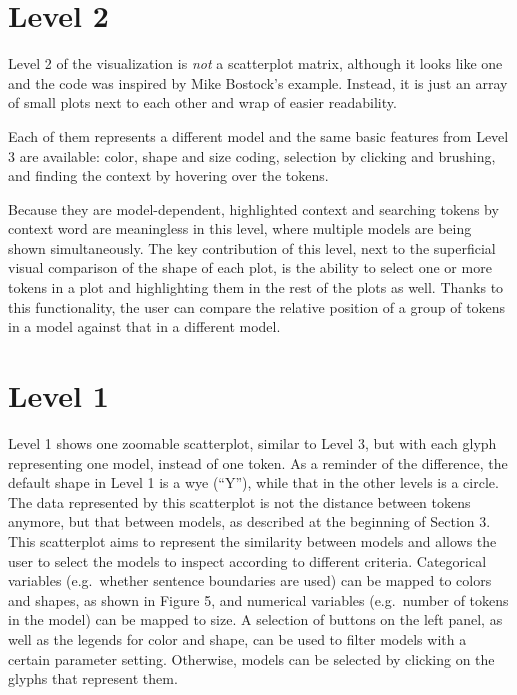 \documentclass[
]{book}
\begin{document}
\hypertarget{level_2}{%
\section{Level 2}\label{level_2}}

Level 2 of the visualization is \emph{not} a scatterplot matrix, although it looks like one and the code was inspired by Mike Bostock's example. Instead, it is just an array of small plots next to each other and wrap of easier readability.

Each of them represents a different model and the same basic features from Level 3 are available: color, shape and size coding, selection by clicking and brushing, and finding the context by hovering over the tokens.

Because they are model-dependent, highlighted context and searching tokens by context word are meaningless in this level, where multiple models are being shown simultaneously. The key contribution of this level, next to the superficial visual comparison of the shape of each plot, is the ability to select one or more tokens in a plot and highlighting them in the rest of the plots as well. Thanks to this functionality, the user can compare the relative position of a group of tokens in a model against that in a different model.

\hypertarget{level_1}{%
\section{Level 1}\label{level_1}}

Level 1 shows one zoomable scatterplot, similar to Level 3, but with each glyph representing one model, instead of one token. As a reminder of the difference, the default shape in Level 1 is a wye (``Y''), while that in the other levels is a circle. The data represented by this scatterplot is not the distance between tokens anymore, but that between models, as described at the beginning of Section 3. This scatterplot aims to represent the similarity between models and allows the user to select the models to inspect according to different criteria. Categorical variables (e.g.~whether sentence boundaries are used) can be mapped to colors and shapes, as shown in Figure 5, and numerical variables (e.g.~number of tokens in the model) can be mapped to size. A selection of buttons on the left panel, as well as the legends for color and shape, can be used to filter models with a certain parameter setting. Otherwise, models can be selected by clicking on the glyphs that represent them.
\end{document}
